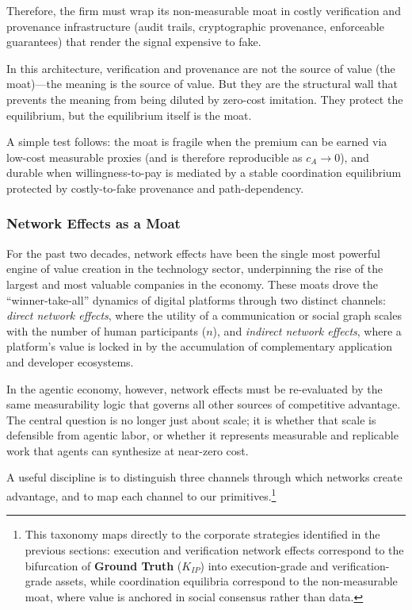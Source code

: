 \documentclass[12pt, letter]{article}
\begin{document}
\begin{itemize}
Therefore, the firm must wrap its non-measurable moat in costly verification and provenance infrastructure (audit trails, cryptographic provenance, enforceable guarantees) that render the signal expensive to fake.

In this architecture, verification and provenance are not the source of value (the moat)—the meaning is the source of value. But they are the structural wall that prevents the meaning from being diluted by zero-cost imitation. They protect the equilibrium, but the equilibrium itself is the moat.
\end{itemize}

A simple test follows: the moat is fragile when the premium can be earned via low-cost measurable proxies (and is therefore reproducible as $c_A \to 0$), and durable when willingness-to-pay is mediated by a stable coordination equilibrium protected by costly-to-fake provenance and path-dependency.



\subsubsection{Network Effects as a Moat}

For the past two decades, network effects have been the single most powerful engine of value creation in the technology sector, underpinning the rise of the largest and most valuable companies in the economy. These moats drove the ``winner-take-all'' dynamics of digital platforms through two distinct channels: \textit{direct network effects}, where the utility of a communication or social graph scales with the number of human participants ($n$), and \textit{indirect network effects}, where a platform's value is locked in by the accumulation of complementary application and developer ecosystems.

In the agentic economy, however, network effects must be re-evaluated by the same measurability logic that governs all other sources of competitive advantage. The central question is no longer just about scale; it is whether that scale is defensible from agentic labor, or whether it represents measurable and replicable work that agents can synthesize at near-zero cost.

A useful discipline is to distinguish three channels through which networks create advantage, and to map each channel to our primitives.\footnote{This taxonomy maps directly to the corporate strategies identified in the previous sections: execution and verification network effects correspond to the bifurcation of \textbf{Ground Truth} ($K_{IP}$) into execution-grade and verification-grade assets, while coordination equilibria correspond to the non-measurable moat, where value is anchored in social consensus rather than data.}
\end{document}
